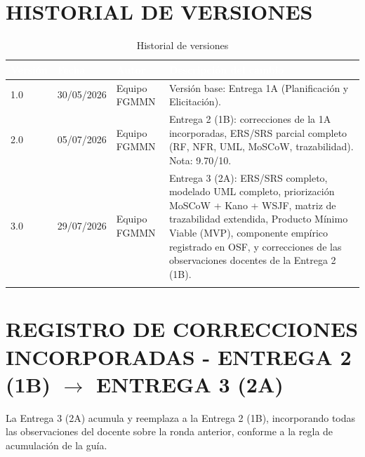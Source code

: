 \section*{HISTORIAL DE VERSIONES}


\begingroup
\small
\begin{longtable}{|p{3.9cm}|p{3.9cm}|p{3.9cm}|p{3.9cm}|}
\hline
\cellcolor{sigagreen}\textcolor{white}{\textbf{Versión}} & \cellcolor{sigagreen}\textcolor{white}{\textbf{Fecha}} & \cellcolor{sigagreen}\textcolor{white}{\textbf{Autor}} & \cellcolor{sigagreen}\textcolor{white}{\textbf{Descripción del cambio}} \\ \hline
1.0 & 30/05/2026 & Equipo FGMMN & Versión base: Entrega 1A (Planificación y Elicitación). \\ \hline
2.0 & 05/07/2026 & Equipo FGMMN & Entrega 2 (1B): correcciones de la 1A incorporadas, ERS/SRS parcial completo (RF, NFR, UML, MoSCoW, trazabilidad). Nota: 9.70/10. \\ \hline
3.0 & 29/07/2026 & Equipo FGMMN & Entrega 3 (2A): ERS/SRS completo, modelado UML completo, priorización MoSCoW + Kano + WSJF, matriz de trazabilidad extendida, Producto Mínimo Viable (MVP), componente empírico registrado en OSF, y correcciones de las observaciones docentes de la Entrega 2 (1B). \\ \hline
\caption{Historial de versiones}
\end{longtable}
\endgroup

\section*{REGISTRO DE CORRECCIONES INCORPORADAS - ENTREGA 2 (1B) $\rightarrow$ ENTREGA 3 (2A)}


La Entrega 3 (2A) acumula y reemplaza a la Entrega 2 (1B), incorporando todas las observaciones del docente sobre la ronda anterior, conforme a la regla de acumulación de la guía.



